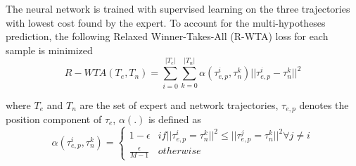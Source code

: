 The neural network is trained with supervised learning on the three trajectories with lowest cost found by the expert. To account for
the multi-hypotheses prediction, the following Relaxed Winner-Takes-All (R-WTA) loss for each sample is minimized
\begin{equation}
	R-WTA(T_e,T_n) = \sum^{|T_e|}_{i=0}\sum^{|T_n|}_{k=0} \alpha(\tau^i_{e,p},\tau^k_n)||\tau^i_{e,p}-\tau^k_n||^2
\end{equation}

where $T_e$ and $T_n$ are the set of expert and network trajectories, $\tau_{e,p}$ denotes the position component of $\tau_e$, $\alpha(.)$ is defined as 
\begin{equation}
	\alpha(\tau^i_{e,p}, \tau^k_n) = 
	\begin{cases}
		1-\epsilon & if ||\tau^i_{e,p}=\tau^k_n||^2 \le ||\tau^j_{e,p}=\tau^k_n||^2 \forall j \ne i \\
		\frac{\epsilon}{M-1} & otherwise
	\end{cases}
\end{equation}

